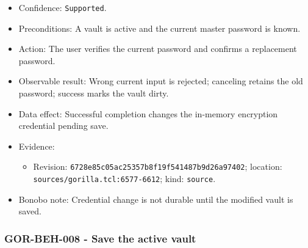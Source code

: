 \documentclass[
  letterpaper,
]{article}
\newcommand{\passthrough}[1]{#1}
\providecommand{\tightlist}{%
  \setlength{\itemsep}{0pt}\setlength{\parskip}{0pt}}
\begin{document}
\begin{itemize}
\tightlist
\item
  Confidence: \passthrough{\lstinline!Supported!}.
\item
  Preconditions: A vault is active and the current master password is known.
\item
  Action: The user verifies the current password and confirms a replacement password.
\item
  Observable result: Wrong current input is rejected; canceling retains the old password; success marks the vault dirty.
\item
  Data effect: Successful completion changes the in-memory encryption credential pending save.
\item
  Evidence:

  \begin{itemize}
  \tightlist
  \item
    Revision: \nolinkurl{6728e85c05ac25357b8f19f541487b9d26a97402}; location: \nolinkurl{sources/gorilla.tcl:6577-6612};
    kind: \passthrough{\lstinline!source!}.
  \end{itemize}
\item
  Bonobo note: Credential change is not durable until the modified vault is saved.
\end{itemize}

\subsubsection{GOR-BEH-008 - Save the active vault}\label{gor-beh-008---save-the-active-vault}
\end{document}
